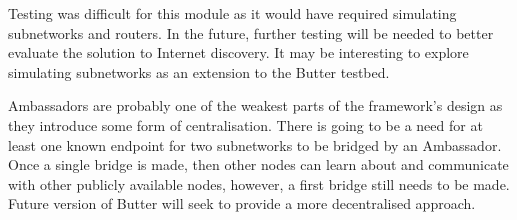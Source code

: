 Testing was difficult for this module as it would have required simulating subnetworks and routers. In the future, further testing will be needed to better evaluate the solution to Internet discovery. It may be interesting to explore simulating subnetworks as an extension to the Butter testbed.

Ambassadors are probably one of the weakest parts of the framework's design as they introduce some form of centralisation. There is going to be a need for at least one known endpoint for two subnetworks to be bridged by an Ambassador. Once a single bridge is made, then other nodes can learn about and communicate with other publicly available nodes, however, a first bridge still needs to be made. Future version of Butter will seek to provide a more decentralised approach.


